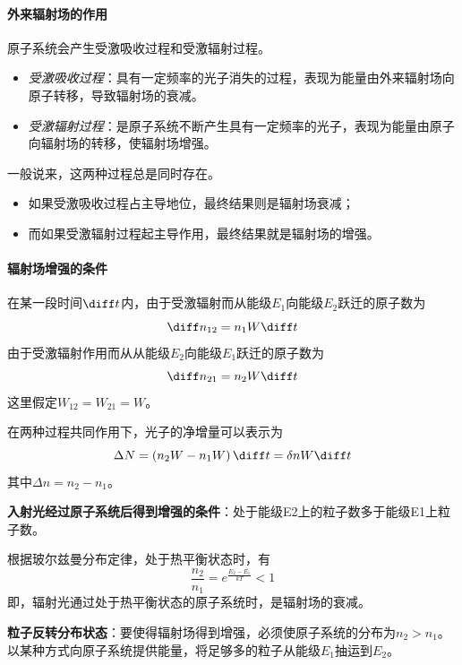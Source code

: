 \paragraph{外来辐射场的作用}原子系统会产生受激吸收过程和受激辐射过程。\begin{itemize}
	\item \textit{受激吸收过程}：具有一定频率的光子消失的过程，表现为能量由外来辐射场向原子转移，导致辐射场的衰减。
	\item \textit{受激辐射过程}：是原子系统不断产生具有一定频率的光子，表现为能量由原子向辐射场的转移，使辐射场增强。
\end{itemize} %
一般说来，这两种过程总是同时存在。\begin{itemize}
	\item 如果受激吸收过程占主导地位，最终结果则是辐射场衰减；
	\item 而如果受激辐射过程起主导作用，最终结果就是辐射场的增强。
\end{itemize}%

\paragraph{辐射场增强的条件}在某一段时间$ \diff t $内，由于受激辐射而从能级$ E_1 $向能级$ E_2 $跃迁的原子数为
\begin{equation} \diff n_{12}=n_1W \diff t \end{equation}
由于受激辐射作用而从从能级$ E_2 $向能级$ E_1 $跃迁的原子数为\begin{equation} \diff n_{21}=n_2W \diff t \end{equation}这里假定$ W_{12} = W_{21} = W $。

在两种过程共同作用下，光子的净增量可以表示为
\begin{equation} \Delta N = \left(n_2W - n_1W\right)\diff t = \delta nW\diff t \end{equation}
其中$ \Delta n = n_2-n_1 $。

\textbf{入射光经过原子系统后得到增强的条件}：处于能级E2上的粒子数多于能级E1上粒子数。

根据玻尔兹曼分布定律，处于热平衡状态时，有
\begin{equation} \dfrac{n_2}{n_1} = e^{\frac{E_2-E_1}{kT}} < 1 \end{equation}
即，辐射光通过处于热平衡状态的原子系统时，是辐射场的衰减。

\textbf{粒子反转分布状态}：要使得辐射场得到增强，必须使原子系统的分布为$ n_2>n_1 $。
以某种方式向原子系统提供能量，将足够多的粒子从能级$ E_1 $抽运到$ E_2 $。


